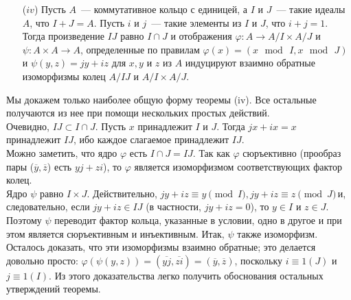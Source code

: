 \documentclass{../../template/mai_book}
\begin{document}
\begin{thm}
\begin{itemize}
    \item[($iv$)]Пусть $A$~— коммутативное кольцо с единицей, а $I$ и $J$~— такие идеалы $A$, что $I + J = A$. Пусть $i$ и $j$~— такие элементы из $I$ и $J$, что $i + j = 1$. Тогда произведение $IJ$ равно $I \cap J$ и отображения $\varphi:A \to A/I \times A/J$ и $\psi: A \times A \to A$, определенные по правилам $\varphi(x) = (x\,\bmod\,I, x\,\bmod\,J)$ и $\psi(y, z) = jy + iz$ для $x, y$ и $z$ из $A$ индуцируют взаимно обратные изоморфизмы колец $A/IJ$ и $A/I \times A/J$.
    \end{itemize}
    \end{thm}

    \begin{myproof}
    Мы докажем только наиболее общую форму теоремы (iv). Все остальные получаются из нее при помощи нескольких простых действий.\\
    Очевидно, $IJ \subset I \cap J$. Пусть $x$ принадлежит $I$ и $J$. Тогда $jx + ix = x$ принадлежит $IJ$, ибо каждое слагаемое принадлежит $IJ$.\\
    Можно заметить, что ядро $\varphi$ есть $I \cap J = IJ$. Так как $\varphi$ сюръективно (прообраз пары ($\overline y, \overline z$) есть $yj + zi$), то $\varphi$ является изоморфизмом соответствующих фактор колец.\\
    Ядро $\psi$ равно $I \times J$. Действительно, $jy + iz \equiv y \pmod I, jy + iz \equiv z \pmod J$\,и, следовательно, если $jy+iz \in IJ$ (в частности, $jy+iz = 0$), то $y \in I$ и $z \in J$. Поэтому $\psi$ переводит фактор кольца, указанные в условии, одно в другое и при этом является сюръективным и инъективным. Итак, $\psi$ также изоморфизм. \\
    Осталось доказать, что эти изоморфизмы взаимно обратные; это делается довольно просто: $\varphi(\psi(y, z)) = (\overline{yj}, \overline{zi}) = (\overline{y}, \overline{z})$, поскольку $i \equiv 1 (J)$ и $j \equiv 1(I)$.
    Из этого доказательства легко получить обоснования остальных утверждений теоремы.
    \end{myproof}
\end{document}

